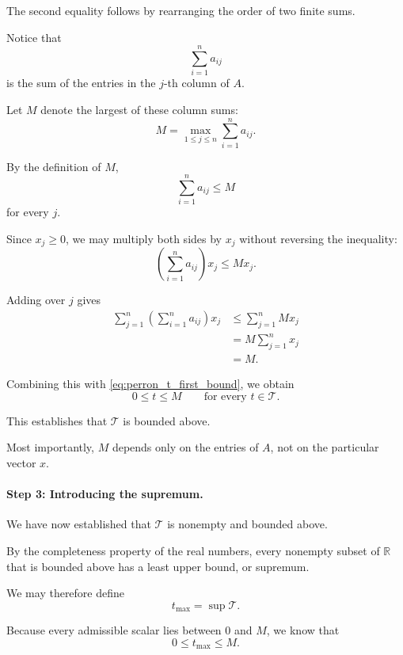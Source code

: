 \documentclass[11pt,a4paper]{article}
\theoremstyle{definition}
\theoremstyle{remark}
\begin{document}
The second equality follows by
rearranging the order of two finite sums.

Notice that
\[
\sum_{i=1}^{n}a_{ij}
\]
is the sum of the entries in
the $j$-th column of $A$.

Let $M$ denote the largest
of these column sums:
\begin{equation}
M=
\max_{1\leq j\leq n}
\sum_{i=1}^{n}a_{ij}.
\end{equation}

By the definition of $M$,
\[
\sum_{i=1}^{n}a_{ij}\leq M
\]
for every $j$.

Since $x_j\geq0$,
we may multiply both sides
by $x_j$ without reversing
the inequality:
\[
\left(
\sum_{i=1}^{n}a_{ij}
\right)x_j
\leq Mx_j.
\]

Adding over $j$ gives
\[
\begin{aligned}
\sum_{j=1}^{n}
\left(
\sum_{i=1}^{n}a_{ij}
\right)x_j
&\leq
\sum_{j=1}^{n}Mx_j\\
&=
M\sum_{j=1}^{n}x_j\\
&=M.
\end{aligned}
\]

Combining this with
\eqref{eq:perron_t_first_bound},
we obtain
\begin{equation}
\boxed{
0\leq t\leq M
\qquad
\text{for every }t\in\mathcal{T}.
}
\label{eq:perron_t_bound}
\end{equation}

This establishes that $\mathcal{T}$
is bounded above.

Most importantly, $M$ depends
only on the entries of $A$,
not on the particular vector $x$.


\paragraph{Step 3: Introducing the supremum.}

We have now established that
$\mathcal{T}$ is nonempty
and bounded above.

By the completeness property
of the real numbers, every
nonempty subset of $\mathbb{R}$
that is bounded above has a
least upper bound, or supremum.

We may therefore define
\begin{equation}
\boxed{
t_{\max}=\sup\mathcal{T}.
}
\label{eq:perron_tmax}
\end{equation}

Because every admissible scalar
lies between $0$ and $M$,
we know that
\[
0\leq t_{\max}\leq M.
\]
\end{document}
